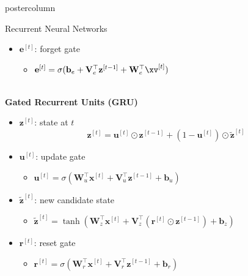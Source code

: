 \documentclass{beamer}
\begin{document}
\begin{frame}[fragile]{}
\begin{columns}
\begin{column}{.31\textwidth}
\begin{beamercolorbox}[center]{postercolumn}
\begin{minipage}{.98\textwidth}
{\begin{myblock}{Recurrent Neural Networks}
\begin{itemize}
\item[] $\mathbf{e}^{[t]}$: forget gate
\begin{itemize} \normalsize
\item[]$\mathbf{e}^{[t]} = \sigma(\mathbf{b}_{e} + \mathbf{V}_e^\top \mathbf{z}^{[t-1]} + \mathbf{W}_e^\top \xv^{[t]})$
\end{itemize}
\end{itemize}
\ \\
\textbf{Gated Recurrent Units (GRU)}
\begin{itemize}
\item[] $\mathbf{z}^{[t]}$: state at $t$
$$\mathbf{z}^{[t]} = \mathbf{u}^{[t]} \odot \mathbf{z}^{[t-1]}  + (1 - \mathbf{u}^{[t]}) \odot \tilde{\mathbf{z}}^{[t]}$$
\item[] $\mathbf{u}^{[t]}$:  update gate 
\begin{itemize} \normalsize
\item[]$\mathbf{u}^{[t]} = \sigma(\mathbf{W}_{u}^\top \mathbf{x}^{[t]} + \mathbf{V}_{u}^\top \mathbf{z}^{[t-1]}  + \mathbf{b}_u)$
\end{itemize}
\item[]$\tilde{\mathbf{z}}^{[t]}$: new candidate state 
\begin{itemize} \normalsize
\item[]$\tilde{\mathbf{z}}^{[t]} = \tanh(\mathbf{W}_{z}^\top \mathbf{x}^{[t]} + \mathbf{V}_{z}^\top \left(\mathbf{r}^{[t]} \odot \mathbf{z}^{[t-1]}\right)  + \mathbf{b}_z)$
\end{itemize}
\item[] $\mathbf{r}^{[t]}$: reset gate 
\begin{itemize} \normalsize
\item[]$\mathbf{r}^{[t]} = \sigma(\mathbf{W}_{r}^\top \mathbf{x}^{[t]} +\mathbf{V}_{r}^\top \mathbf{z}^{[t-1]} + \mathbf{b}_r)$
\end{itemize}
\end{itemize}
\end{myblock}


}
\end{minipage}
\end{beamercolorbox}
\end{column}
\end{columns}
\end{frame}
\end{document}

